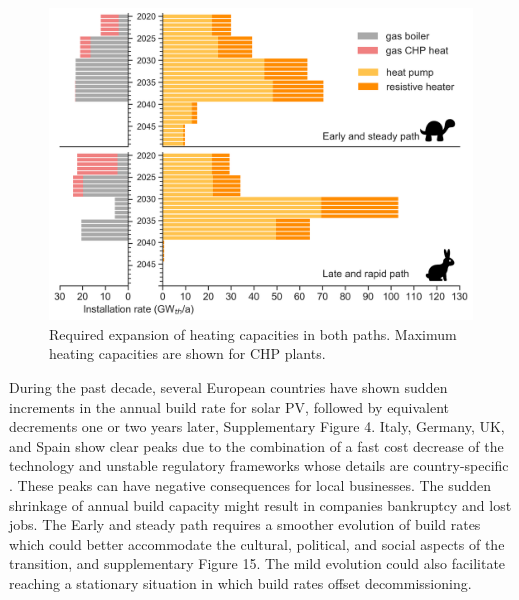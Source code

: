 \documentclass[5p]{elsarticle} %
\begin{document}
\begin{figure}[!h]
\centering
\includegraphics[width=\columnwidth]{../figures/heating_expansion_Base.png}
\caption{Required expansion of heating capacities in both paths. Maximum heating capacities are shown for CHP plants.} \label{fig_heating_expansion} 
\end{figure}

During the past decade, several European countries have shown sudden increments in the annual build rate for solar PV, followed by equivalent decrements one or two years later, Supplementary Figure 4. Italy, Germany, UK, and Spain show clear peaks due to the combination of a fast cost decrease of the technology and unstable regulatory frameworks whose details are country-specific \cite{Chase_2019, Report_Fraunhofer_2019, Victoria_2012}. These peaks can have negative consequences for local businesses. The sudden shrinkage of annual build capacity might result in companies bankruptcy and lost jobs. The Early and steady path requires a smoother evolution of build rates which could better accommodate the cultural, political, and social aspects of the transition, \cite{Geels_2017} and supplementary Figure 15. The mild evolution could also facilitate reaching a stationary situation in which build rates offset decommissioning. \\ 
\end{document}
